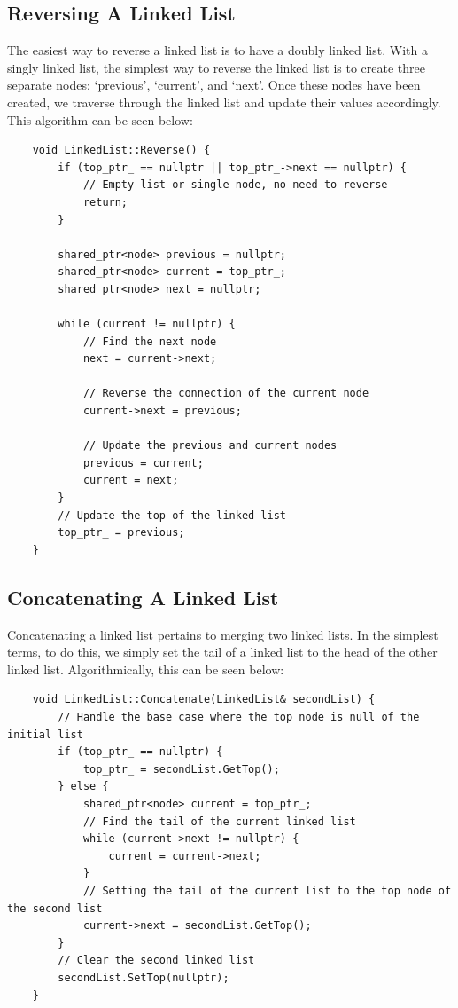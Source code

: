 \documentclass[a4paper,9pt]{article}
\begin{document}
\subsection*{Reversing A Linked List}

The easiest way to reverse a linked list is to have a doubly linked list. With a singly linked list, the 
simplest way to
reverse the linked list is to create three separate nodes: `previous', `current', and `next'. Once these 
nodes have been
created, we traverse through the linked list and update their values accordingly. This algorithm can be seen 
below:

\begin{highlight}
    \begin{verbatim}
    void LinkedList::Reverse() {
        if (top_ptr_ == nullptr || top_ptr_->next == nullptr) {
            // Empty list or single node, no need to reverse
            return;
        }
        
        shared_ptr<node> previous = nullptr;
        shared_ptr<node> current = top_ptr_;
        shared_ptr<node> next = nullptr;
        
        while (current != nullptr) {
            // Find the next node 
            next = current->next;
            
            // Reverse the connection of the current node 
            current->next = previous;
            
            // Update the previous and current nodes
            previous = current;
            current = next;
        }
        // Update the top of the linked list
        top_ptr_ = previous;
    }        
    \end{verbatim}
\end{highlight}

\subsection*{Concatenating A Linked List}

Concatenating a linked list pertains to merging two linked lists. In the simplest terms, to do this, we 
simply set the tail
of a linked list to the head of the other linked list. Algorithmically, this can be seen below:

\begin{highlight}
    \begin{verbatim}
    void LinkedList::Concatenate(LinkedList& secondList) {
        // Handle the base case where the top node is null of the initial list
        if (top_ptr_ == nullptr) {
            top_ptr_ = secondList.GetTop();
        } else {
            shared_ptr<node> current = top_ptr_;
            // Find the tail of the current linked list
            while (current->next != nullptr) {
                current = current->next;
            }
            // Setting the tail of the current list to the top node of the second list
            current->next = secondList.GetTop();
        }
        // Clear the second linked list
        secondList.SetTop(nullptr);
    }        
    \end{verbatim}
\end{highlight}
\end{document}
